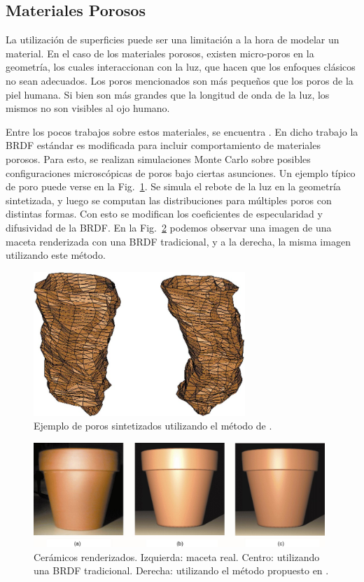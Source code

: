 \subsection{Materiales Porosos}
La utilización de superficies puede ser una limitación a la hora de modelar un material.
En el caso de los materiales porosos, existen micro-poros en la geometría, los cuales interaccionan con la luz, que hacen que los enfoques clásicos no sean adecuados.
Los poros mencionados son más pequeños que los poros de la piel humana.
Si bien son más grandes que la longitud de onda de la luz, los mismos no son visibles al ojo humano.

Entre los pocos trabajos sobre estos materiales, se encuentra \cite{Merillou2000}.
En dicho trabajo la BRDF estándar es modificada para incluir comportamiento de materiales porosos.
Para esto, se realizan simulaciones Monte Carlo sobre posibles configuraciones microscópicas de poros bajo ciertas asunciones.
Un ejemplo típico de poro puede verse en la Fig.~\ref{fg:poro}.
Se simula el rebote de la luz en la geometría sintetizada, y luego se computan las distribuciones para múltiples poros con distintas formas.
Con esto se modifican los coeficientes de especularidad y difusividad de la BRDF.
En la Fig.~\ref{fg:ceramico} podemos observar una imagen de una maceta renderizada con una BRDF tradicional, y a la derecha, la misma imagen utilizando este método.

\begin{figure}
\center
\includegraphics[width=8cm]{figures/poro}
\caption[Poros sinterizados]{Ejemplo de poros sintetizados utilizando el método de \cite{Merillou2000}.}
\label{fg:poro}
\end{figure}

\begin{figure}
\center
\includegraphics[width=11cm]{figures/ceramico}
\caption[Cerámicos renderizados]{Cerámicos renderizados. Izquierda: maceta real. Centro: utilizando una BRDF tradicional. Derecha: utilizando el método propuesto en \cite{Merillou2000}.}
\label{fg:ceramico}
\end{figure}

